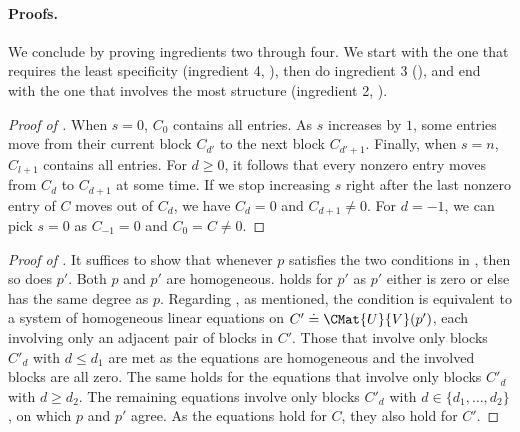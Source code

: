 \paragraph{Proofs.}
We conclude by proving ingredients two through four.
We start with the one that requires the least specificity (ingredient 4, ), then do ingredient 3 (), and end with the one that involves the most structure (ingredient 2, ).

\begin{proof}[Proof of ]
  When $s=0$, $C_0$ contains all entries. 
  As $s$ increases by $1$,
  some entries move from their current block $C_{d'}$ to the next block
  $C_{d'+1}$.
  Finally, when $s=n$, $C_{l+1}$ contains all entries.
  For $d \ge 0$, it follows that every nonzero entry moves from $C_d$ to $C_{d+1}$ at some time. If we stop increasing $s$ right after the last nonzero entry of $C$ moves
  out of \(C_d\), we have $C_d=0$ and $C_{d+1} \ne 0$. For $d=-1$, we can pick $s=0$ as $C_{-1}=0$ and $C_0=C \ne 0$. 
\end{proof}

\begin{proof}[Proof of ]
  It suffices to show that whenever $p$ satisfies the two conditions in
  , then so does $p'$. Both $p$ and $p'$ are homogeneous. 
   holds for $p'$ as
  \(p'\) either is zero or else has the same degree as \(p\).
  Regarding , as
  mentioned, the condition is equivalent to a system of homogeneous
  linear equations on \(C' \doteq \CMat{U}{V}(p')\), each involving
  only an adjacent pair of blocks in $C'$.
  Those that involve only blocks $C'_d$ with $d \le d_1$ are met as the
  equations are homogeneous and the involved blocks are all zero.
  The same holds for the equations that involve only blocks $C'_d$
  with $d \ge d_2$.
  The remaining equations involve only blocks $C'_d$ with
  $d \in \{d_1, \dots, d_2\}$,
  on which $p$ and $p'$ agree.
  As the equations hold for \(C\), they also hold for $C'$.
\end{proof}

